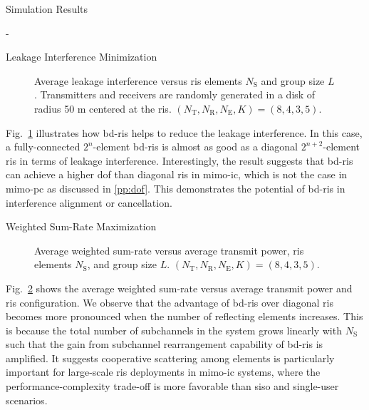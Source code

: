 \begin{section}{Simulation Results}
	\begin{subsection}{-}
		\begin{subsubsection}{Leakage Interference Minimization}
			\begin{figure}[H]
				\centering
				\resizebox{0.65\columnwidth}{!}{
					
				}
				\caption{Average leakage interference versus \gls{ris} elements $N_\mathrm{S}$ and group size $L$. Transmitters and receivers are randomly generated in a disk of radius 50 m centered at the \gls{ris}. $(N_\mathrm{T}, N_\mathrm{R}, N_\mathrm{E}, K) = (8, 4, 3, 5)$.}
				\label{sm:ic_interference_sx}
			\end{figure}
			Fig.~\ref{sm:ic_interference_sx} illustrates how \gls{bd}-\gls{ris} helps to reduce the leakage interference.
			In this case, a fully-connected $2^n$-element \gls{bd}-\gls{ris} is almost as good as a diagonal $2^{n+2}$-element \gls{ris} in terms of leakage interference.
			Interestingly, the result suggests that \gls{bd}-\gls{ris} can achieve a higher \gls{dof} than diagonal \gls{ris} in \gls{mimo}-\gls{ic}, which is not the case in \gls{mimo}-\gls{pc} as discussed in \ref{pp:dof}.
			This demonstrates the potential of \gls{bd}-\gls{ris} in interference alignment or cancellation.
		\end{subsubsection}

		\begin{subsubsection}{Weighted Sum-Rate Maximization}
			\begin{figure}[H]
				\centering
				\resizebox{0.65\columnwidth}{!}{
					
				}
				\caption{Average weighted sum-rate versus average transmit power, \gls{ris} elements $N_\mathrm{S}$, and group size $L$. $(N_\mathrm{T}, N_\mathrm{R}, N_\mathrm{E}, K) = (8, 4, 3, 5)$.}
				\label{sm:ic_rate_sx}
			\end{figure}

			Fig.~\ref{sm:ic_rate_sx} shows the average weighted sum-rate versus average transmit power and \gls{ris} configuration.
			We observe that the advantage of \gls{bd}-\gls{ris} over diagonal \gls{ris} becomes more pronounced when the number of reflecting elements increases.
			This is because the total number of subchannels in the system grows linearly with $N_\mathrm{S}$ such that the gain from subchannel rearrangement capability of \gls{bd}-\gls{ris} is amplified.
			It suggests cooperative scattering among elements is particularly important for large-scale \gls{ris} deployments in \gls{mimo}-\gls{ic} systems, where the performance-complexity trade-off is more favorable than \gls{siso} and single-user scenarios.


\end{subsubsection}
\end{subsection}
\end{section}
